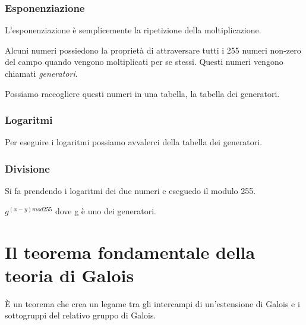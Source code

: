 \subsubsection{Esponenziazione} %

\textsf{\small L'esponenziazione è semplicemente la ripetizione della moltiplicazione.}

\textsf{\small Alcuni numeri possiedono la proprietà di attraversare tutti i 255 numeri non-zero del campo quando vengono moltiplicati per se stessi. Questi numeri vengono chiamati \emph{generatori}.} %

\textsf{\small Possiamo raccogliere questi numeri in una tabella, la tabella dei generatori.}


\subsubsection{Logaritmi}

\textsf{\small Per eseguire i logaritmi possiamo avvalerci della tabella dei generatori.} %


\subsubsection{Divisione}

\textsf{\small Si fa prendendo i logaritmi dei due numeri e eseguedo il modulo 255.}

\textsf{\small $g^{(x - y) mod 255}$ dove g è uno dei generatori. }





\section{Il teorema fondamentale della teoria di Galois} %
\textsf{\small È un teorema che crea un legame tra gli intercampi di un'estensione di Galois e i sottogruppi del relativo gruppo di Galois.} %


